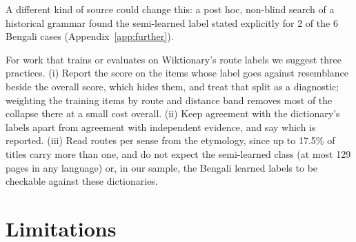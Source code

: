 \documentclass[11pt]{article}
\begin{document}
A different kind of source could change this: a post hoc, non-blind search of a historical grammar found the semi-learned label stated explicitly for 2 of the 6 Bengali cases (Appendix~\ref{app:further}).

For work that trains or evaluates on Wiktionary's route labels we suggest three practices. (i) Report the score on the items whose label goes against resemblance beside the overall score, which hides them, and treat that split as a diagnostic; weighting the training items by route and distance band removes most of the collapse there at a small cost overall. (ii) Keep agreement with the dictionary's labels apart from agreement with independent evidence, and say which is reported. (iii) Read routes per sense from the etymology, since up to 17.5\% of titles carry more than one, and do not expect the semi-learned class (at most 129 pages in any language) or, in our sample, the Bengali learned labels to be checkable against these dictionaries.

\section*{Limitations}
\end{document}
